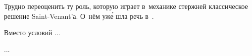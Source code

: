 
\begin{otherlanguage}{russian}

Трудно переоценить ту роль, которую играет в~механике стержней классическое решение Saint\hbox{-\hspace{-0.2ex}}Venant’а.
О~нём уж\'{е} шла речь в~.

Вместо условий ...

...



\end{otherlanguage}



